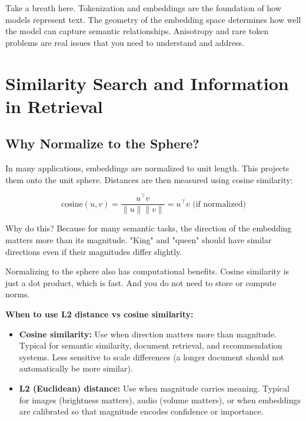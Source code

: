 \vspace{2em}

Take a breath here. Tokenization and embeddings are the foundation of how models represent text. The geometry of the embedding space determines how well the model can capture semantic relationships. Anisotropy and rare token problems are real issues that you need to understand and address.

\vspace{2em}

\section{Similarity Search and Information in Retrieval}

\subsection{Why Normalize to the Sphere?}

In many applications, embeddings are normalized to unit length. This projects them onto the unit sphere. Distances are then measured using cosine similarity:

\begin{equation}
\text{cosine}(u, v) = \frac{u^\top v}{\|u\| \|v\|} = u^\top v \text{ (if normalized)}
\end{equation}

Why do this? Because for many semantic tasks, the direction of the embedding matters more than its magnitude. "King" and "queen" should have similar directions even if their magnitudes differ slightly.

\vspace{1em}

Normalizing to the sphere also has computational benefits. Cosine similarity is just a dot product, which is fast. And you do not need to store or compute norms.

\vspace{1em}

\textbf{When to use L2 distance vs cosine similarity:}

\begin{itemize}
\item \textbf{Cosine similarity:} Use when direction matters more than magnitude. Typical for semantic similarity, document retrieval, and recommendation systems. Less sensitive to scale differences (a longer document should not automatically be more similar).

\item \textbf{L2 (Euclidean) distance:} Use when magnitude carries meaning. Typical for images (brightness matters), audio (volume matters), or when embeddings are calibrated so that magnitude encodes confidence or importance.
\end{itemize}

